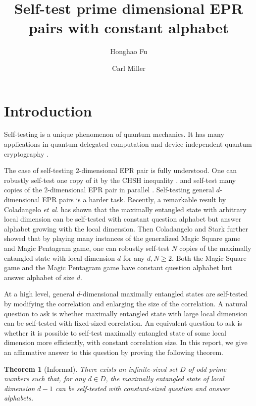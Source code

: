 \documentclass[11pt,letterpaper]{article}
\newcommand{\1}{\mathbb{1}}
\newtheorem{theorem}{Theorem}
\theoremstyle{definition}
\begin{document}
\title{Self-test prime dimensional EPR pairs with constant alphabet}

\author[1]{Honghao Fu}
\author[1,2]{Carl Miller}

\renewcommand\Affilfont{\itshape\small}



\maketitle

\section{Introduction}
\label{sec:intro}
Self-testing is a unique phenomenon of quantum mechanics. It has many applications in quantum
delegated computation \cite{ruv2013,cgsv2017} and device independent quantum cryptography
\cite{qkd2011,qkd2014,miller2016,fu2018,eat2018}.

The case of self-testing $2$-dimensional EPR pair is fully understood. One can robustly self-test
one copy of it by the CHSH inequality \cite{bamps2015}. and self-test many copies of the $2$-dimensional EPR
pair in parallel \cite{mckague2016, coladan2017parallel}. 
Self-testing general $d$-dimensional EPR pairs is a harder task.
Recently, a remarkable result by Coladangelo \textit{et al}.\cite{cgs2017} 
has shown that the maximally entangled state with arbitrary local dimension 
can be self-tested with constant question alphabet but answer alphabet growing with
the local dimension. 
Then Coladangelo and Stark \cite{coladan2017} further showed that by playing many instances
of the generalized Magic Square game and Magic Pentagram game, one can robustly self-test
$N$ copies of the maximally entangled state with local dimension $d$ for any $d, N \geq 2$.
Both the Magic Square game and the Magic Pentagram game have constant question alphabet
but answer alphabet of size $d$.

At a high level, general $d$-dimensional maximally entangled states are self-tested by
modifying the correlation and enlarging the size of the correlation.
A natural question to ask is whether maximally entangled state with large local dimension
can be self-tested with fixed-sized correlation. 
An equivalent question to ask is whether it is possible to self-test maximally
entangled state of some local dimension more efficiently, with constant correlation size. 
In this report, we give an affirmative answer to this question by proving the following theorem.
\begin{theorem}[Informal]
\label{thm:inf}
	There exists an infinite-sized set $D$ of odd prime numbers such that, for any $d \in D$, 
	the maximally entangled state of local dimension $d-1$ can be self-tested 
	with constant-sized question and answer alphabets.
\end{theorem}
\end{document}
